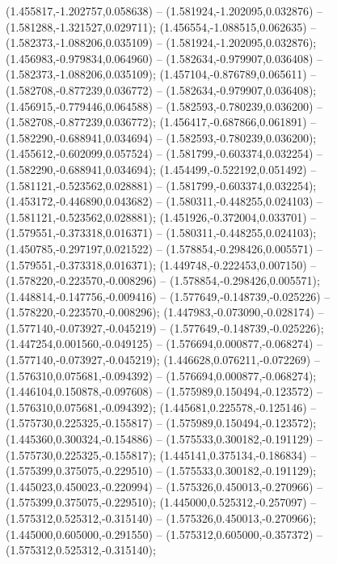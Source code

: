  (1.455817,-1.202757,0.058638) -- (1.581924,-1.202095,0.032876) -- (1.581288,-1.321527,0.029711);
 (1.456554,-1.088515,0.062635) -- (1.582373,-1.088206,0.035109) -- (1.581924,-1.202095,0.032876);
 (1.456983,-0.979834,0.064960) -- (1.582634,-0.979907,0.036408) -- (1.582373,-1.088206,0.035109);
 (1.457104,-0.876789,0.065611) -- (1.582708,-0.877239,0.036772) -- (1.582634,-0.979907,0.036408);
 (1.456915,-0.779446,0.064588) -- (1.582593,-0.780239,0.036200) -- (1.582708,-0.877239,0.036772);
 (1.456417,-0.687866,0.061891) -- (1.582290,-0.688941,0.034694) -- (1.582593,-0.780239,0.036200);
 (1.455612,-0.602099,0.057524) -- (1.581799,-0.603374,0.032254) -- (1.582290,-0.688941,0.034694);
 (1.454499,-0.522192,0.051492) -- (1.581121,-0.523562,0.028881) -- (1.581799,-0.603374,0.032254);
 (1.453172,-0.446890,0.043682) -- (1.580311,-0.448255,0.024103) -- (1.581121,-0.523562,0.028881);
 (1.451926,-0.372004,0.033701) -- (1.579551,-0.373318,0.016371) -- (1.580311,-0.448255,0.024103);
 (1.450785,-0.297197,0.021522) -- (1.578854,-0.298426,0.005571) -- (1.579551,-0.373318,0.016371);
 (1.449748,-0.222453,0.007150) -- (1.578220,-0.223570,-0.008296) -- (1.578854,-0.298426,0.005571);
 (1.448814,-0.147756,-0.009416) -- (1.577649,-0.148739,-0.025226) -- (1.578220,-0.223570,-0.008296);
 (1.447983,-0.073090,-0.028174) -- (1.577140,-0.073927,-0.045219) -- (1.577649,-0.148739,-0.025226);
 (1.447254,0.001560,-0.049125) -- (1.576694,0.000877,-0.068274) -- (1.577140,-0.073927,-0.045219);
 (1.446628,0.076211,-0.072269) -- (1.576310,0.075681,-0.094392) -- (1.576694,0.000877,-0.068274);
 (1.446104,0.150878,-0.097608) -- (1.575989,0.150494,-0.123572) -- (1.576310,0.075681,-0.094392);
 (1.445681,0.225578,-0.125146) -- (1.575730,0.225325,-0.155817) -- (1.575989,0.150494,-0.123572);
 (1.445360,0.300324,-0.154886) -- (1.575533,0.300182,-0.191129) -- (1.575730,0.225325,-0.155817);
 (1.445141,0.375134,-0.186834) -- (1.575399,0.375075,-0.229510) -- (1.575533,0.300182,-0.191129);
 (1.445023,0.450023,-0.220994) -- (1.575326,0.450013,-0.270966) -- (1.575399,0.375075,-0.229510);
 (1.445000,0.525312,-0.257097) -- (1.575312,0.525312,-0.315140) -- (1.575326,0.450013,-0.270966);
 (1.445000,0.605000,-0.291550) -- (1.575312,0.605000,-0.357372) -- (1.575312,0.525312,-0.315140);
